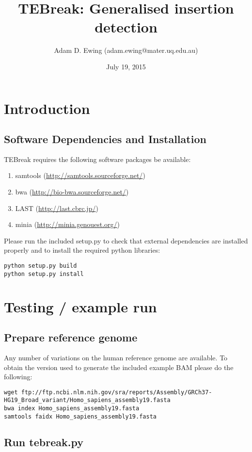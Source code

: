 \documentclass[letterpaper,11pt]{article}
\title{TEBreak: Generalised insertion detection}
\author{Adam D. Ewing (adam.ewing@mater.uq.edu.au)}
\begin{document}
 \date{July 19, 2015}
 \maketitle

\section{Introduction}
\subsection{Software Dependencies and Installation}
TEBreak requires the following software packages be available:

\begin{enumerate}
  \item samtools (\url{http://samtools.sourceforge.net/})
  \item bwa (\url{http://bio-bwa.sourceforge.net/})
  \item LAST (\url{http://last.cbrc.jp/})
  \item minia (\url{http://minia.genouest.org/})
\end{enumerate}

Please run the included setup.py to check that external dependencies are installed properly and to install the required python libraries:

\begin{verbatim}
python setup.py build
python setup.py install
\end{verbatim}

\section{Testing / example run}
\subsection{Prepare reference genome}
Any number of variations on the human reference genome are available. To obtain the version used to generate the included example BAM please do the following:
\begin{verbatim}
wget ftp://ftp.ncbi.nlm.nih.gov/sra/reports/Assembly/GRCh37-HG19_Broad_variant/Homo_sapiens_assembly19.fasta
bwa index Homo_sapiens_assembly19.fasta
samtools faidx Homo_sapiens_assembly19.fasta
\end{verbatim}

\subsection{Run tebreak.py}
\end{document}
